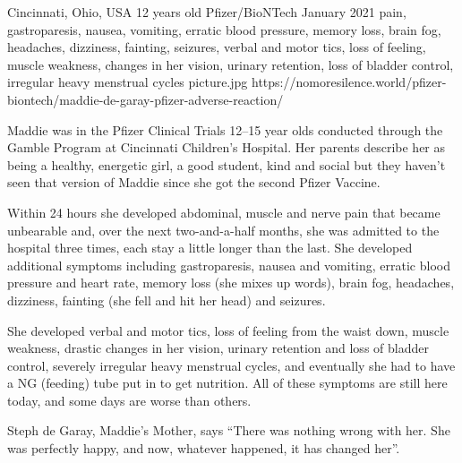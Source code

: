           {Cincinnati, Ohio, USA}
          {12 years old}
          {Pfizer/BioNTech}
          {January 2021}
          {pain, gastroparesis, nausea, vomiting,  erratic blood pressure, memory loss, brain fog, headaches, dizziness, fainting, seizures,  verbal and motor tics, loss of feeling, muscle weakness,  changes in her vision, urinary retention, loss of bladder control,  irregular heavy menstrual cycles}
          {picture.jpg}
          {https://nomoresilence.world/pfizer-biontech/maddie-de-garay-pfizer-adverse-reaction/}
          {

Maddie was in the Pfizer Clinical Trials 12–15 year olds conducted through the
Gamble Program at Cincinnati Children's Hospital. Her parents describe her as
being a healthy, energetic girl, a good student, kind and social but
they haven't seen that version of Maddie since she got the second Pfizer
Vaccine.

Within 24 hours she developed abdominal, muscle and nerve pain that became
unbearable and, over the next two-and-a-half months, she was admitted to the
hospital three times, each stay a little longer than the last. She developed
additional symptoms including gastroparesis, nausea and vomiting, erratic blood
pressure and heart rate, memory loss (she mixes up words), brain fog, headaches,
dizziness, fainting (she fell and hit her head) and seizures.

She developed verbal and motor tics, loss of feeling from the waist down, muscle
weakness, drastic changes in her vision, urinary retention and loss of bladder
control, severely irregular heavy menstrual cycles, and eventually she had to
have a NG (feeding) tube put in to get nutrition. All of these symptoms are
still here today, and some days are worse than others.

Steph de Garay, Maddie's Mother, says “There was nothing wrong with her. She was
perfectly happy, and now, whatever happened, it has changed her”.

}
